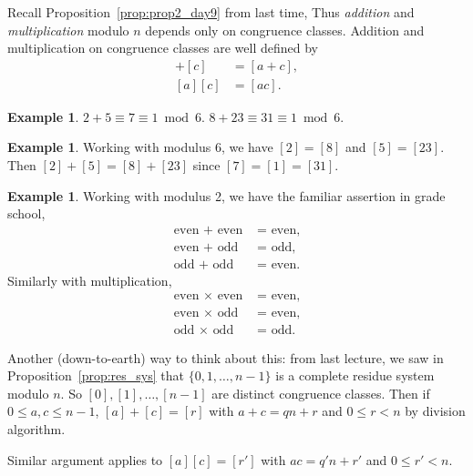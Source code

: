 \documentclass{amsbook}
\theoremstyle{plain}
\theoremstyle{definition}
\newtheorem{example}[theorem]{Example}
\theoremstyle{remark}
\numberwithin{equation}{chapter}
\numberwithin{figure}{chapter}
\begin{document}
Recall Proposition~\ref{prop:prop2_day9} from last time,
\proptwodaynine*
Thus \emph{addition} and \emph{multiplication} modulo $n$ depends only on congruence classes. Addition and multiplication on congruence classes are well defined by
\begin{align}
  [a] + [c] &= [a + c], \\
  [a][c]    &= [ac].
\end{align}
\begin{example}
  $2 + 5 \equiv 7 \equiv 1 \bmod 6$. $8 + 23 \equiv 31 \equiv 1 \bmod 6$.
\end{example}
\begin{example}
  Working with modulus 6, we have $[2] = [8]$ and $[5] = [23]$. Then $[2] + [5] = [8] + [23]$ since $[7] = [1] = [31]$.
\end{example}
\begin{example}
  Working with modulus 2, we have the familiar assertion in grade school,
\begin{align}
  \text { even + even } & \text{= even, } \\
  \text { even + odd } & \text{= odd, } \\
  \text { odd + odd } & \text{= even.}
\end{align}
Similarly with multiplication, 
\begin{align}
  \text { even $\times$ even } & \text{= even, } \\
  \text { even $\times$ odd } & \text{= even, } \\
  \text { odd $\times$ odd } & \text{= odd.}
\end{align}
\end{example}

Another (down-to-earth) way to think about this: from last lecture, we saw in Proposition~\ref{prop:res_sys} that $\{ 0, 1, \ldots, n -1 \}$ is a complete residue system modulo $n$. So $[0], [1], \ldots, [n-1]$ are distinct congruence classes. Then if $0 \leqslant a, c \leqslant n - 1$, $[a] + [c] = [r]$ with $a + c = qn + r$ and $0 \leqslant r < n$ by division algorithm.

Similar argument applies to $[a] [c] = [r']$ with $a c = q'n + r'$ and $0 \leqslant r' < n$.
\end{document}
